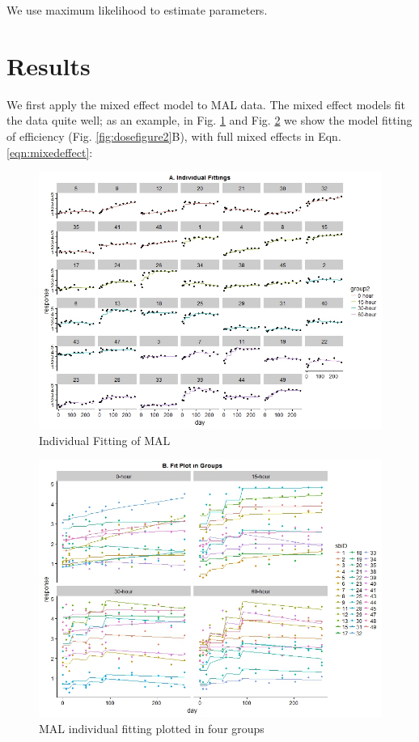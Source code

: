 {We use maximum likelihood to estimate parameters.


\section{Results}
We first apply the mixed effect model to MAL data. 
The mixed effect models fit the data quite well; 
as an example, in Fig. \ref{fig:dosefitA} and Fig. \ref{fig:dosefitB} we show the model fitting of efficiency (Fig. \ref{fig:dosefigure2}B), with full mixed effects in Eqn. \ref{eqn:mixedeffect}:

\begin{figure}
	\centering
	\includegraphics[width=1\linewidth]{figures/dosefitA}
	\caption[Individual Fitting]{Individual Fitting of MAL}
	\label{fig:dosefitA}
\end{figure}
\begin{figure}
	\centering
	\includegraphics[width=1\linewidth]{figures/dosefitB}
	\caption[Plot by Groups]{MAL individual fitting plotted in four groups}
	\label{fig:dosefitB}
\end{figure}

}
